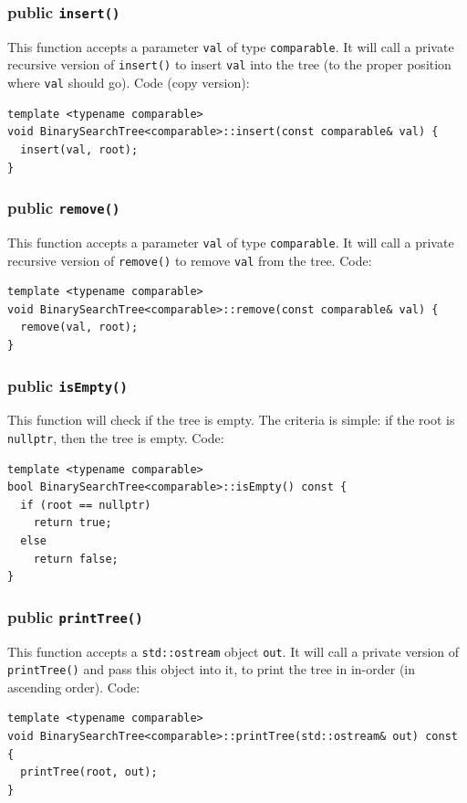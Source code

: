 \documentclass[12pt]{book}
\begin{document}
\subsubsection{public \texttt{insert()}}
\label{sec:orgfc991f1}
This function accepts a parameter \texttt{val} of type \texttt{comparable}. It will call a private recursive version of \texttt{insert()} to insert \texttt{val} into the tree (to the proper position where \texttt{val} should go). Code (copy version):
\begin{verbatim}
template <typename comparable>
void BinarySearchTree<comparable>::insert(const comparable& val) {
  insert(val, root);
}
\end{verbatim}

\subsubsection{public \texttt{remove()}}
\label{sec:orgc19de53}
This function accepts a parameter \texttt{val} of type \texttt{comparable}. It will call a private recursive version of \texttt{remove()} to remove \texttt{val} from the tree. Code:
\begin{verbatim}
template <typename comparable>
void BinarySearchTree<comparable>::remove(const comparable& val) {
  remove(val, root);
}
\end{verbatim}

\subsubsection{public \texttt{isEmpty()}}
\label{sec:orgc2900c3}
This function will check if the tree is empty. The criteria is simple: if the root is \texttt{nullptr}, then the tree is empty. Code:
\begin{verbatim}
template <typename comparable>
bool BinarySearchTree<comparable>::isEmpty() const {
  if (root == nullptr)
    return true;
  else 
    return false;
}
\end{verbatim}

\subsubsection{public \texttt{printTree()}}
\label{sec:orgdc15de1}
This function accepts a \texttt{std::ostream} object \texttt{out}. It will call a private version of \texttt{printTree()} and pass this object into it, to print the tree in in-order (in ascending order). Code:
\begin{verbatim}
template <typename comparable>
void BinarySearchTree<comparable>::printTree(std::ostream& out) const {
  printTree(root, out);
} 
\end{verbatim}
\end{document}
